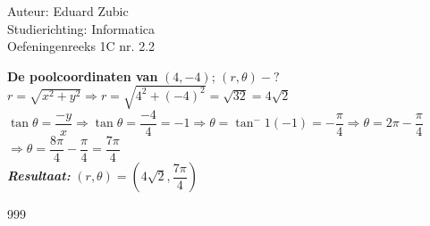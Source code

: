 \documentclass[a4paper]{article}
\begin{document}
  
\noindent \large Auteur: Eduard Zubic \\
\noindent \large Studierichting: Informatica\\
\noindent \large Oefeningenreeks 1C nr. 2.2\\

\medskip

\normalsize

\textbf{De poolcoordinaten van} $(4, -4)$; $(r, \theta) - ?$ \\

$r = \sqrt{x^2 + y^2} \Rightarrow r  = \sqrt{4^2 + (-4)^2} = \sqrt{32} = 4\sqrt{2}$\\

$\tan\theta = \dfrac{-y}{x} \Rightarrow \tan\theta = \dfrac{-4}{4} = -1 \Rightarrow \theta = \tan^-1(-1) = -\dfrac{\pi}{4} \Rightarrow \theta = 2\pi -\dfrac{\pi}{4}$\\ 

$\Rightarrow
 \theta = \dfrac{8\pi}{4} 
-\dfrac{\pi}{4} = \dfrac{7\pi}{4}$\\

\textbf{\emph{Resultaat:}} $(r, \theta) = \left(4\sqrt{2}, \dfrac{7\pi}{4}\right)$




\begin{thebibliography}{999}
\end{thebibliography}
\end{document}
